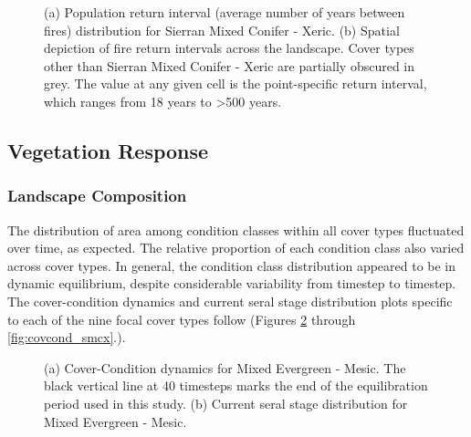 \begin{figure}[!htbp]
  \centering
  \caption{(a) Population return interval (average number of years between fires) distribution for Sierran Mixed Conifer - Xeric.  (b) Spatial depiction of fire return intervals across the landscape. Cover types other than Sierran Mixed Conifer - Xeric are partially obscured in grey. The value at any given cell is the point-specific return interval, which ranges from 18 years to \textgreater 500 years.}
\label{fig:preturn_smcx}
\end{figure}

\newpage
\subsection{Vegetation Response}
\label{subsec:HRVvegresponse}

\subsubsection{Landscape Composition}

The distribution of area among condition classes within all cover types fluctuated over time, as expected. The relative proportion of each condition class also varied across cover types. In general, the condition class distribution appeared to be in dynamic equilibrium, despite considerable variability from timestep to timestep. The cover-condition dynamics and current seral stage distribution plots specific to each of the nine focal cover types follow (Figures \ref{fig:covcond_megm} through \ref{fig:covcond_smcx}.).

\begin{figure}[!htbp]
  \centering
  \caption{(a) Cover-Condition dynamics for Mixed Evergreen - Mesic. The black vertical line at 40 timesteps marks the end of the equilibration period used in this study. (b) Current seral stage distribution for Mixed Evergreen - Mesic.}
\label{fig:covcond_megm}
\end{figure}

